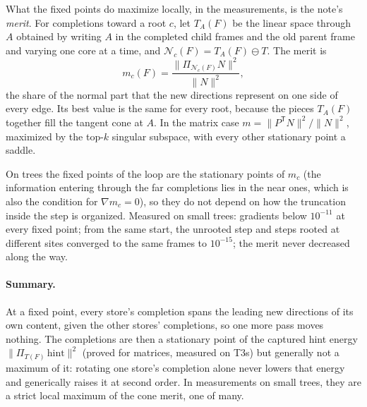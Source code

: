 \documentclass[11pt]{article}
\newcommand{\T}{\mathsf{T}}
\newcommand{\Nc}{\mathcal{N}}
\theoremstyle{definition}
\theoremstyle{plain}
\begin{document}
What the fixed points do maximize locally, in the measurements, is the note's \emph{merit}. For completions toward a root $c$, let $T_A(F)$ be the linear
space through $A$ obtained by writing $A$ in the completed child frames and the old parent frame and varying one core
at a time, and $\Nc_c(F)=T_A(F)\ominus T$. The merit is
\begin{equation}\label{eq:merit}
  m_c(F)=\frac{\|\Pi_{\Nc_c(F)}N\|^2}{\|N\|^2},
\end{equation}
the share of the normal part that the new directions represent on one side of every edge. Its best value is the
same for every root, because the pieces $T_A(F)$ together fill the tangent cone at $A$. In the matrix case
$m=\|P^\T N\|^2/\|N\|^2$, maximized by the top-$k$ singular subspace, with every other stationary point a saddle.

On trees the fixed points of the loop are the stationary points of $m_c$ (the information entering through the far
completions lies in the near ones, which is also the condition for $\nabla m_c=0$), so they do not depend on how the
truncation inside the step is organized. Measured on small trees: gradients below $10^{-11}$ at every fixed point;
from the same start, the unrooted step and steps rooted at different sites converged to the same frames to
$10^{-15}$; the merit never decreased along the way.

\paragraph{Summary.} At a fixed point, every store's completion spans the leading new directions of its own content,
given the other stores' completions, so one more pass moves nothing. The completions are then a stationary point of
the captured hint energy $\|\Pi_{T(F)}\,\mathrm{hint}\|^2$ (proved for matrices, measured on T3s) but generally not a
maximum of it: rotating one store's completion alone never lowers that energy and generically raises it at second
order. In measurements on small trees, they are a strict local maximum of the cone merit, one of many.
\end{document}
